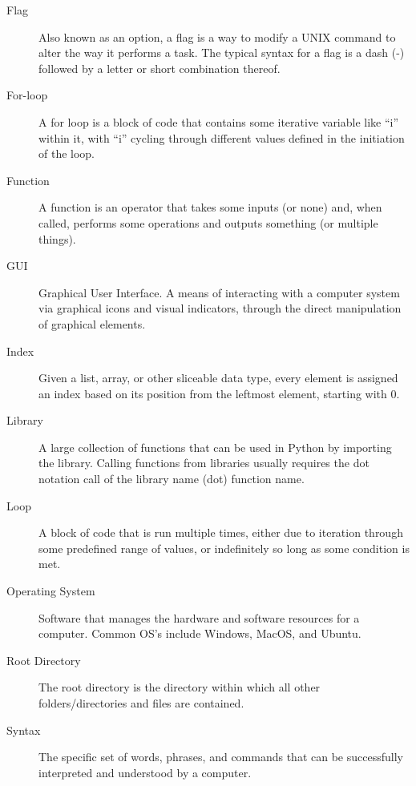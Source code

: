 \begin{description}
    \item[Flag] Also known as an option, a flag is a way to modify a UNIX command to alter the way it performs a task. %
    The typical syntax for a flag is a dash (-) followed by a letter or short combination thereof. %

    \item[For-loop] A for loop is a block of code that contains some iterative variable like ``i'' within it, with ``i'' cycling through different values defined in the initiation of the loop. %

    \item[Function] A function is an operator that takes some inputs (or none) and, when called, performs some operations and outputs something (or multiple things). %

    \item[GUI] Graphical User Interface. A means of interacting with a computer system via graphical icons and visual indicators, through the direct manipulation of graphical elements. %

    \item[Index] Given a list, array, or other sliceable data type, every element is assigned an index based on its position from the leftmost element, starting with 0. %

    \item[Library] A large collection of functions that can be used in Python by importing the library. %
    Calling functions from libraries usually requires the dot notation call of the library name (dot) function name. %

    \item[Loop] A block of code that is run multiple times, either due to iteration through some predefined range of values, or indefinitely so long as some condition is met. %

    \item[Operating System] Software that manages the hardware and software resources for a computer. %
    Common OS's include Windows, MacOS, and Ubuntu. %

    \item[Root Directory] The root directory is the directory within which all other folders/directories and files are contained. %

    \item[Syntax] The specific set of words, phrases, and commands that can be successfully interpreted and understood by a computer. %
\end{description}